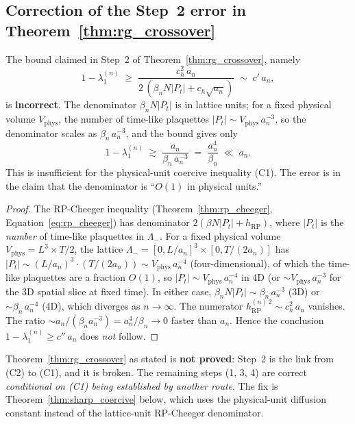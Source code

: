 \subsection{Correction of the Step~2 error in
Theorem~\ref{thm:rg_crossover}}
\label{ssec:step2_correction}

\begin{theorem}
\label{thm:step2_error}
The bound claimed in Step~2 of Theorem~\ref{thm:rg_crossover},
namely
\[
  1-\lambda_{1}^{(n)}
  \;\ge\;\frac{c_{h}^{2}\,a_{n}}
       {2\,(\beta_{n}N|P_{t}|+c_{h}\sqrt{a_{n}})}
  \;\sim\;c'\,a_{n},
\]
is \textbf{incorrect}. The denominator
$\beta_{n}N|P_{t}|$ is in lattice units; for a fixed physical
volume $V_{\mathrm{phys}}$, the number of time-like plaquettes
$|P_{t}|\sim V_{\mathrm{phys}}\,a_{n}^{-3}$, so the denominator
scales as $\beta_{n}\,a_{n}^{-3}$, and the bound gives only
\[
  1-\lambda_{1}^{(n)}
  \;\gtrsim\;\frac{a_{n}}{\beta_{n}\,a_{n}^{-3}}
  \;=\;\frac{a_{n}^{4}}{\beta_{n}}
  \;\ll\;a_{n}.
\]
This is insufficient for the physical-unit coercive inequality
(C1). The error is in the claim that the denominator is
``$O(1)$ in physical units.''
\end{theorem}

\begin{proof}
The RP-Cheeger inequality
(Theorem~\ref{thm:rp_cheeger}, Equation~\eqref{eq:rp_cheeger})
has denominator $2(\beta N|P_{t}|+h_{\mathrm{RP}})$, where
$|P_{t}|$ is the \emph{number} of time-like plaquettes in
$\Lambda_{-}$. For a fixed physical volume
$V_{\mathrm{phys}}=L^{3}\times T/2$, the lattice
$\Lambda_{-}=[0,L/a_{n}]^{3}\times[0,T/(2a_{n})]$ has
$|P_{t}|\sim (L/a_{n})^{3}\cdot(T/(2a_{n}))\sim V_{\mathrm{phys}}\,
a_{n}^{-4}$ (four-dimensional), of which the time-like plaquettes
are a fraction $O(1)$, so $|P_{t}|\sim V_{\mathrm{phys}}\,
a_{n}^{-4}$ in 4D (or $\sim V_{\mathrm{phys}}\,a_{n}^{-3}$ for the
3D spatial slice at fixed time). In either case,
$\beta_{n}N|P_{t}|\sim\beta_{n}\,a_{n}^{-3}$ (3D) or
$\sim\beta_{n}\,a_{n}^{-4}$ (4D), which diverges as
$n\to\infty$. The numerator
$h_{\mathrm{RP}}^{(n)\,2}\sim c_{h}^{2}\,a_{n}$ vanishes. The
ratio $\sim a_{n}/(\beta_{n}a_{n}^{-3})=a_{n}^{4}/\beta_{n}\to 0$
faster than $a_{n}$. Hence the conclusion
$1-\lambda_{1}^{(n)}\ge c''\,a_{n}$ does \emph{not} follow.
\end{proof}

\begin{remark}
\label{rem:step2_consequence}
Theorem~\ref{thm:rg_crossover} as stated is \textbf{not proved}:
Step~2 is the link from (C2) to (C1), and it is broken. The
remaining steps (1, 3, 4) are correct \emph{conditional on (C1)
being established by another route}. The fix is
Theorem~\ref{thm:sharp_coercive} below, which uses the
physical-unit diffusion constant instead of the lattice-unit
RP-Cheeger denominator.
\end{remark}

